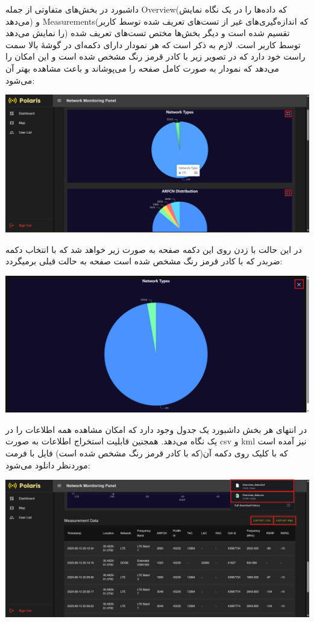 \begin{itemize}
   		داشبورد در بخش‌های متفاوتی از جمله Overview(که داده‌ها را در یک نگاه نمایش می‌دهد) و Measurements(که اندازه‌گیری‌های غیر از تست‌های تعریف شده توسط کاربر را نمایش می‌دهد) تقسیم شده است و دیگر بخش‌ها مختص تست‌های تعریف شده توسط کاربر است.
   		لازم به ذکر است که هر نمودار دارای دکمه‌ای در گوشۀ بالا سمت راست خود دارد که در تصویر زیر با کادر قرمز رنگ مشخص شده است و این امکان را می‌دهد که نمودار به صورت کامل صفحه را می‌پوشاند و باعث مشاهده بهتر آن می‌شود:
	   		\begin{center}
	   			\includegraphics[width=\textwidth]{images/fr-chart-minimize.png}
	   		\end{center}
   		در این حالت با زدن روی این دکمه صفحه به صورت زیر خواهد شد که با انتخاب دکمه ضربدر که با کادر قرمز رنگ مشخص شده است صفحه به حالت قبلی بر‌میگردد:
	   		\begin{center}
				\includegraphics[width=\textwidth]{images/fr-chart-maximize.png}
			\end{center}
		در انتهای هر بخش داشبورد یک جدول وجود دارد که امکان مشاهده همه اطلاعات را در یک نگاه می‌دهد. همجنین قابلیت استخراج اطلاعات به صورت csv و kml نیز آمده است که با کلیک روی دکمه آن(که با کادر قرمز رنگ مشخص شده است) فایل با فرمت موردنظر دانلود می‌شود:
			\begin{center}
				\includegraphics[width=\textwidth]{images/fr-table-export.png}

\end{center}
\end{itemize}
